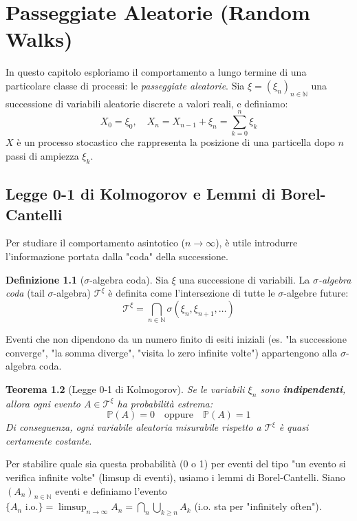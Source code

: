 \documentclass[11pt, a4paper]{report}
\theoremstyle{plain}
\newtheorem{theorem}{Teorema}[chapter]
\theoremstyle{definition}
\newtheorem{definition}[theorem]{Definizione}
\theoremstyle{remark}
\newcommand{\PP}{\mathbb{P}}
\newcommand{\N}{\mathbb{N}}
\newcommand{\1}{\mathbf{1}}
\begin{document}
\chapter{Passeggiate Aleatorie (Random Walks)}

In questo capitolo esploriamo il comportamento a lungo termine di una particolare classe di processi: le \emph{passeggiate aleatorie}. 
Sia $\xi = (\xi_n)_{n \in \N}$ una successione di variabili aleatorie discrete a valori reali, e definiamo:
\[ X_0 = \xi_0, \quad X_n = X_{n-1} + \xi_n = \sum_{k=0}^n \xi_k \]
$X$ è un processo stocastico che rappresenta la posizione di una particella dopo $n$ passi di ampiezza $\xi_k$.

\section{Legge 0-1 di Kolmogorov e Lemmi di Borel-Cantelli}

Per studiare il comportamento asintotico ($n \to \infty$), è utile introdurre l'informazione portata dalla "coda" della successione.

\begin{definition}[$\sigma$-algebra coda]
Sia $\xi$ una successione di variabili. La \emph{$\sigma$-algebra coda} (tail $\sigma$-algebra) $\mathcal{T}^\xi$ è definita come l'intersezione di tutte le $\sigma$-algebre future:
\[ \mathcal{T}^\xi = \bigcap_{n \in \N} \sigma(\xi_n, \xi_{n+1}, \dots) \]
\end{definition}

Eventi che non dipendono da un numero finito di esiti iniziali (es. "la successione converge", "la somma diverge", "visita lo zero infinite volte") appartengono alla $\sigma$-algebra coda.

\begin{theorem}[Legge 0-1 di Kolmogorov]
Se le variabili $\xi_n$ sono \textbf{indipendenti}, allora ogni evento $A \in \mathcal{T}^\xi$ ha probabilità estrema:
\[ \PP(A) = 0 \quad \text{oppure} \quad \PP(A) = 1 \]
Di conseguenza, ogni variabile aleatoria misurabile rispetto a $\mathcal{T}^\xi$ è quasi certamente costante.
\end{theorem}

Per stabilire quale sia questa probabilità (0 o 1) per eventi del tipo "un evento si verifica infinite volte" (limsup di eventi), usiamo i lemmi di Borel-Cantelli.
Siano $(A_n)_{n \in \N}$ eventi e definiamo l'evento $\{A_n \text{ i.o.}\} = \limsup_{n \to \infty} A_n = \bigcap_{n} \bigcup_{k \ge n} A_k$ (i.o. sta per "infinitely often").
\end{document}
